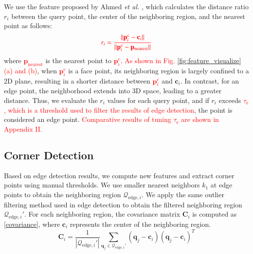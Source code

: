 \documentclass[journal]{IEEEtran}
\newcommand{\rev}[1]{\textcolor{red}{#1}}
\begin{document}
We use the feature proposed by Ahmed \textit{et al.} \cite{ahmed2018edge}, which calculates the distance ratio $r_i$ between the query point, the center of the neighboring region, and the nearest point as follows:
\begin{equation}
\rev{
    r_i = \frac{\| \mathbf{p}_i^\text{c} - \mathbf{c}_i \|}{\| \mathbf{p}_i^\text{c} - \mathbf{p}_{\text{nearest}} \|}
    }
\end{equation}
where \rev{\( \mathbf{p}_{\text{nearest}} \)} is the nearest point to \rev{$\mathbf{p}_i^\text{c}$}. 
\rev{As shown in Fig. \ref{fig:feature_visualize}(a) and (b)}, when \rev{$\mathbf{p}_i^\text{c}$} is a face point, its neighboring region is largely confined to a 2D plane, resulting in a shorter distance between \rev{$\mathbf{p}_i^\text{c}$} and \( \mathbf{c}_i \). In contrast, for an edge point, the neighborhood extends into 3D space, leading to a greater distance. 
Thus, we evaluate the \( r_i \) values for each query point, and if \( r_i \) exceeds \rev{$\tau_\text{e}$, which is a threshold used to filter the results of edge detection}, the point is considered an edge point. \rev{Comparative results of tuning $\tau_\text{e}$ are shown in Appendix II.}

\subsection{Corner Detection}
Based on edge detection results, we compute new features and extract corner points using manual thresholds. We use smaller nearest neighbors \( k_1 \) at edge points to obtain the neighboring region \( \mathcal{Q}_{\text{edge}, i} \). We apply the same outlier filtering method used in edge detection to obtain the filtered neighboring region \( \mathcal{Q}_{\text{edge}, i}' \). For each neighboring region, the covariance matrix \( \mathbf{C}_i \) is computed as \cref{covariance}, where \( \mathbf{c}_i \) represents the center of the neighboring region.
\begin{equation}
    \mathbf{C}_i = \frac{1}{|\mathcal{Q}_{\text{edge}, i}'|} \sum_{\mathbf{q}_j \in \mathcal{Q}_{\text{edge}, i}'} (\mathbf{q}_j - \mathbf{c}_i)(\mathbf{q}_j - \mathbf{c}_i)^T
    \label{covariance}
\end{equation}
\end{document}

